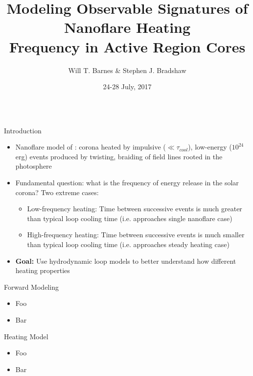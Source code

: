 \documentclass[final]{beamer}
\title[Observable Signatures of Nanoflares]{Modeling Observable Signatures of Nanoflare Heating\\Frequency in Active Region Cores}
\author[Barnes \& Bradshaw]{Will T. Barnes \& Stephen J. Bradshaw}
\institute[Rice University]{Department of Physics and Astronomy\\Rice University}
\date{24-28 July, 2017}
\begin{document}
\begin{frame}
  \begin{columns}[T]
  \hfill
  \begin{column}{0.49\linewidth}
    \begin{block}{Introduction}
    \vspace{-1ex}
    \begin{itemize}
      \item Nanoflare model of \citet{parker_nanoflares_1988}: corona heated by impulsive ($\ll\tau_{cool}$), low-energy ($10^{24}$ erg) events produced by twisting, braiding of field lines rooted in the photosphere
      \item Fundamental question: \alert{what is the frequency of energy release in the solar corona?} Two extreme cases:
      \begin{itemize}
        \item Low-frequency heating: Time between successive events is much greater than typical loop cooling time (i.e. approaches single nanoflare case)
        \item High-frequency heating: Time between successive events is much smaller than typical loop cooling time (i.e. approaches steady heating case)
      \end{itemize}
      \item \textbf{Goal:} \alert{Use hydrodynamic loop models to better understand how different heating properties}
    \end{itemize}
    \end{block}
    \begin{block}{Forward Modeling}
      \vspace{-1ex}
      \begin{itemize}
      \item Foo
      \item Bar
      \end{itemize}
    \end{block}
    \begin{block}{Heating Model}
      \vspace{-1ex}
      \begin{itemize}
      \item Foo
      \item Bar
      \end{itemize}

\end{block}
\end{column}
\end{columns}
\end{frame}
\end{document}
